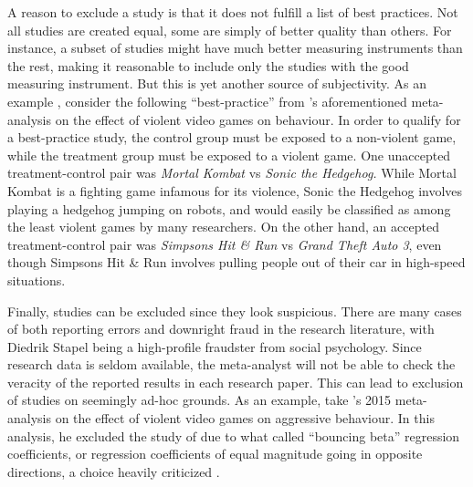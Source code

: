 A reason to exclude a study is that it does not fulfill a list of best practices. Not all studies are created equal, some are simply of better quality than others. For instance, a subset of studies might have much better measuring instruments than the rest, making it reasonable to include only the studies with the good measuring instrument. But this is yet another source of subjectivity. As an example \parencite[][p. 6]{lakens_reproducibility_2016}, consider the following ``best-practice'' from \cite{Anderson2010-ki}'s aforementioned meta-analysis on the effect of violent video games  on behaviour. In order to qualify for a best-practice study, the control group must be exposed to a non-violent game, while the treatment group must be exposed to a violent game. One unaccepted treatment-control pair was \emph{Mortal Kombat} vs \emph{Sonic the Hedgehog.} While Mortal Kombat is a fighting game infamous for its violence, Sonic the Hedgehog involves playing a hedgehog jumping on robots, and would easily be classified as among the least violent games by many researchers. On the other hand, an accepted treatment-control pair was \emph{Simpsons Hit \& Run} vs \emph{Grand Theft Auto 3}, even though Simpsons Hit \& Run involves pulling people out of their car in high-speed situations. 

Finally, studies can be excluded since they look suspicious. There are many cases of both reporting errors \parencite{Nuijten2016-eu} and downright fraud in the research literature, with Diedrik Stapel being a high-profile fraudster from social psychology. Since research data is seldom available, the meta-analyst will not be able to check the veracity of the reported results in each research paper. This can lead to exclusion of studies on seemingly ad-hoc grounds. As an example, take \citeauthor{ferguson_angry_2015}'s 2015 meta-analysis on the effect of violent video games on aggressive behaviour. In this analysis, he excluded the study of \cite{gentile_effects_2009} due to what \cite{ferguson_angry_2015} called ``bouncing beta'' regression coefficients, or regression coefficients of equal magnitude going in opposite directions, a choice heavily criticized \cite{gentile_what_2015}.

